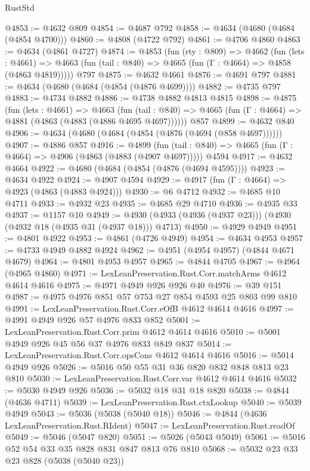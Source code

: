 \begin{lexlean}{RustStd}
\begin{coremodule}
@4853 := @4632 @809
@4854 := @4687 @792
@4858 := @4634 (@4680 (@4684 (@4854 @4700)))
@4860 := @4808 (@4722 @792)
@4861 := @4706 @4860
@4863 := @4634 (@4861 @4727)
@4874 := @4853
    (fun (rty : @809) =>
    @4662
      (fun (lets : @4661) =>
      @4663 (fun (tail : @840) => @4665 (fun (Γ : @4664) => @4858 (@4863 @4819)))))
    @797
@4875 := @4632 @4661
@4876 := @4691 @797
@4881 := @4634 (@4680 (@4684 (@4854 (@4876 @4699))))
@4882 := @4735 @797
@4883 := @4734 @4882
@4886 := @4738 @4882 @4813 @4815
@4898 := @4875
    (fun (lets : @4661) =>
    @4663
      (fun (tail : @840) => @4665 (fun (Γ : @4664) => @4881 (@4863 (@4883 (@4886 @4695 @4697))))))
    @857
@4899 := @4632 @840
@4906 := @4634 (@4680 (@4684 (@4854 (@4876 (@4694 (@858 @4697))))))
@4907 := @4886 @857
@4916 := @4899
    (fun (tail : @840) => @4665 (fun (Γ : @4664) => @4906 (@4863 (@4883 (@4907 @4697)))))
    @4594
@4917 := @4632 @4664
@4922 := @4680 (@4684 (@4854 (@4876 (@4694 @4595))))
@4923 := @4634 @4922
@4924 := @4907 @4594
@4929 := @4917 (fun (Γ : @4664) => @4923 (@4863 (@4883 @4924)))
@4930 := @6 @4712
@4932 := @4685 @10 @4711
@4933 := @4932 @23
@4935 := @4685 @29 @4710
@4936 := @4935 @33
@4937 := @1157 @10
@4949 := @4930 (@4933 (@4936 (@4937 @23))) (@4930 (@4932 @18 (@4935 @31 (@4937 @18))) @4713)
@4950 := @4929 @4949
@4951 := @4801 @4922
@4953 := @4861 (@4726 @4949)
@4954 := @4634 @4953
@4957 := @4733 @4949 @4882 @4924
@4962 := @4951 (@4954 @4957) (@4844 @4671 @4679)
@4964 := @4801 @4953 @4957
@4965 := @4844 @4705
@4967 := @4964 (@4965 @4860)
@4971 := LexLeanPreservation.Rust.Corr.matchArms @4612 @4614 @4616
@4975 := @4971 @4949 @926 @926 @40
@4976 := @39 @151
@4987 := @4975 @4976 @851 @57 @753 @27 @854 @4593 @25 @803 @99 @810
@4991 := LexLeanPreservation.Rust.Corr.eOfB @4612 @4614 @4616
@4997 := @4991 @4949 @926 @57 @4976 @833 @852
@5001 := LexLeanPreservation.Rust.Corr.prim @4612 @4614 @4616
@5010 := @5001 @4949 @926 @45 @56 @37 @4976 @833 @849 @837
@5014 := LexLeanPreservation.Rust.Corr.opsCons @4612 @4614 @4616
@5016 := @5014 @4949 @926
@5026 := @5016 @50 @55 @31 @36 @820 @832 @848 @813 @23 @810
@5030 := LexLeanPreservation.Rust.Corr.var @4612 @4614 @4616
@5032 := @5030 @4949 @926
@5036 := @5032 @18 @31 @18 @820
@5038 := @4844 (@4636 @4711)
@5039 := LexLeanPreservation.Rust.ctxLookup
@5040 := @5039 @4949
@5043 := @5036 (@5038 (@5040 @18))
@5046 := @4844 (@4636 LexLeanPreservation.Rust.RIdent)
@5047 := LexLeanPreservation.Rust.readOf
@5049 := @5046 (@5047 @820)
@5051 := @5026 (@5043 @5049)
@5061 := @5016 @52 @54 @33 @35 @828 @831 @847 @813 @76 @810
@5068 := @5032 @23 @33 @23 @828 (@5038 (@5040 @23))

\end{coremodule}
\end{lexlean}
